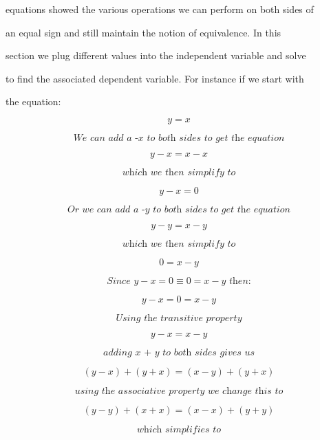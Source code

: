 equations showed the various operations we can perform on both sides of

an equal sign and still maintain the notion of equivalence. In this

section we plug different values into the independent variable and solve

to find the associated dependent variable. For instance if we start with

the equation:



$$y = x$$



$$\textit{We can add a -x to both sides to get the equation}$$



$$y -x = x - x$$



$$\textit{which we then simplify to}$$



$$y -x = 0$$



$$\textit{Or we can add a -y to both sides to get the equation}$$



$$y -y = x - y$$



$$\textit{which we then simplify to}$$



$$0 = x - y$$



$$\textit{Since $y -x = 0  \equiv 0 = x - y$ then:}$$



$$y -x = 0 = x - y$$



$$\textit{Using the transitive property}$$



$$y -x  = x - y$$



$$\textit{adding x + y to both sides gives us}$$



$$(y -x )+( y + x)  = (x - y) + (y + x)$$



$$\textit{using the associative property we change this to}$$



$$(y - y )+( x + x)  = (x - x) + (y + y)$$



$$\textit{which simplifies to}$$



